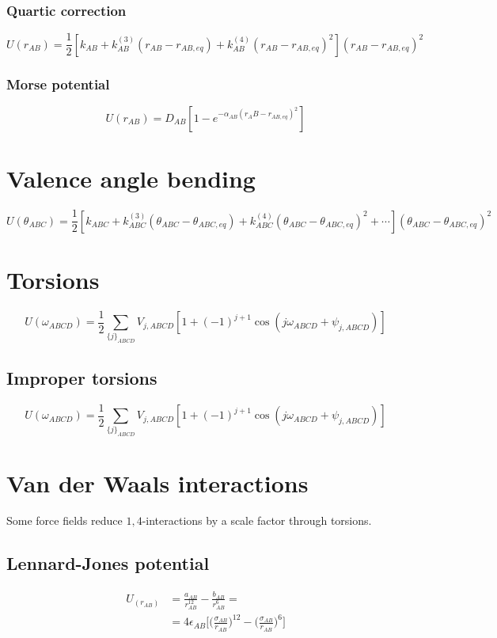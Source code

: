 		\subsubsection{Quartic correction}

		$$U(r_{AB}) = \frac{1}{2}[k_{AB}+k^{(3)}_{AB}(r_{AB}-r_{AB, eq}) + k^{(4)}_{AB}(r_{AB}-r_{AB,eq})^2](r_{AB}-r_{AB, eq})^2$$

		\subsubsection{Morse potential}

		$$U(r_{AB}) = D_{AB}[1-e^{-\alpha_{AB}(r_AB-r_{AB,eq})^2}]$$

\section{Valence angle bending}

$$U(\theta_{ABC}) = \frac{1}{2}[k_{ABC}+k^{(3)}_{ABC}(\theta_{ABC}-\theta_{ABC,eq})+k^{(4)}_{ABC}(\theta_{ABC}-\theta_{ABC,eq})^2+\cdots](\theta_{ABC}-\theta_{ABC, eq})^2$$

\section{Torsions}

$$U(\omega_{ABCD}) = \frac{1}{2}\sum\limits_{\{j\}_{ABCD}}V_{j,ABCD}[1+(-1)^{j+1}\cos(j\omega_{ABCD}+\psi_{j,ABCD})]$$

	\subsection{Improper torsions}

$$U(\omega_{ABCD}) = \frac{1}{2}\sum\limits_{\{j\}_{ABCD}}V_{j,ABCD}[1+(-1)^{j+1}\cos(j\omega_{ABCD}+\psi_{j,ABCD})]$$

\section{Van der Waals interactions}
Some force fields reduce $1,4$-interactions by a scale factor through torsions.

	\subsection{Lennard-Jones potential}

	\begin{align*}
		U_(r_{AB}) &= \frac{a_{AB}}{r^{12}_{AB}}-\frac{b_{AB}}{r^6_{AB}}=\\
							 &= 4\epsilon_{AB}\biggl[\biggl(\frac{\sigma_{AB}}{r_{AB}}\biggr)^{12}-\biggl(\frac{\sigma_{AB}}{r_{AB}}\biggr)^6\biggr]
	\end{align*}

